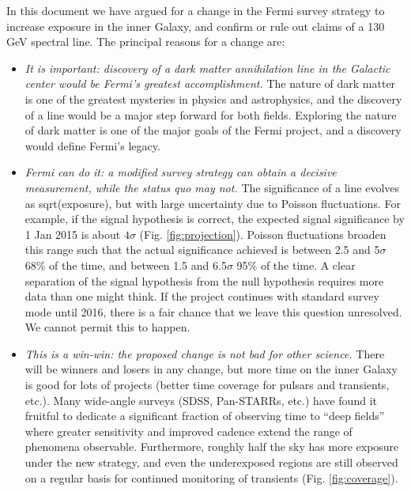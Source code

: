 \documentclass[aps,prd,superscriptaddress,nofootinbib,fixlfloat, 12pt]{revtex4-1}
\begin{document}
In this document we have argued for a change in the Fermi survey strategy to
increase exposure in the inner Galaxy, and confirm or rule out claims of a 130
GeV spectral line.  The principal reasons for a change are:

\begin{itemize}

\item{\it It is important: discovery of a dark matter annihilation line in the
    Galactic center would be Fermi's greatest accomplishment.}  The nature of
  dark matter is one of the greatest mysteries in physics and astrophysics,
  and the discovery of a line would be a major step forward for both fields.
  Exploring the nature of dark matter is one of the major goals of the Fermi
  project, and a discovery would define Fermi's legacy.

\item{\it Fermi can do it: a modified survey strategy can obtain a decisive
    measurement, while the status quo may not.}  The significance of a line
  evolves as sqrt(exposure), but with large uncertainty due to Poisson
  fluctuations.  For example, if the signal hypothesis is correct, the
  expected signal significance by 1 Jan 2015 is about $4\sigma$
  (Fig. \ref{fig:projection}).  Poisson fluctuations broaden this range such
  that the actual significance achieved is between 2.5 and
  5$\sigma$ 68\% of the time, and between 1.5 and 6.5$\sigma$ 95\% of the
  time.  A clear separation of the signal hypothesis from the null hypothesis
  requires more data than one might think.  If the project continues with
  standard survey mode until 2016, there is a fair chance that we leave this
  question unresolved.  We cannot permit this to happen.

\item{\it This is a win-win: the proposed change is not bad for other science.}  There will be winners and
  losers in any change, but more time on the inner Galaxy is good for lots of
  projects (better time coverage for pulsars and transients, etc.).  Many
  wide-angle surveys (SDSS, Pan-STARRs, etc.) have found it fruitful to
  dedicate a significant fraction of observing time to ``deep fields'' where
  greater sensitivity and improved cadence extend the range of phenomena
  observable.  Furthermore, roughly half
  the sky has more exposure under the new strategy, and even the underexposed
  regions are still observed on a regular basis for continued monitoring of
  transients (Fig. \ref{fig:coverage}).

\end{itemize}
\end{document}
